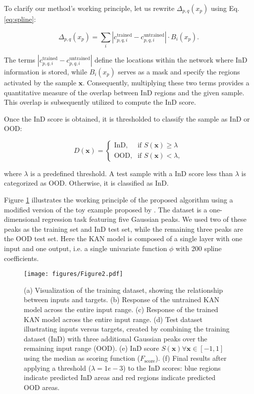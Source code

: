 To clarify our method's working principle, let us rewrite $\Delta_{p,q}(x_p)$ using Eq. \ref{eq:spline}:

\begin{equation}
    \Delta_{p,q}(x_p) = \sum_{i} \left| c_{p,q,i}^{\text{trained}} - c_{p,q,i}^{\text{untrained}}\right| \cdot B_i(x_p).
\end{equation}

The terms $\left| c_{p,q,i}^{\text{trained}} - c_{p,q,i}^{\text{untrained}}\right|$ define the locations within the network where InD information is stored, while $B_i(x_p)$ serves as a mask and specify the regions activated by the sample $\textbf{x}$. 
Consequently, multiplying these two terms provides a quantitative measure of the overlap between InD regions and the given sample. 
This overlap is subsequently utilized to compute the InD score.

Once the InD score is obtained, it is thresholded to classify the sample as InD or OOD:

\begin{equation}
D(\textbf{x}) = 
\begin{cases} 
\text{InD,} & \text{if } S(\textbf{x}) \geq \lambda \\
\text{OOD,} & \text{if } S(\textbf{x}) < \lambda, 
\end{cases}
\end{equation}

where \(\lambda\) is a predefined threshold. 
A test sample with a InD score less than \(\lambda\) is categorized as OOD. 
Otherwise, it is classified as InD. 

Figure \ref{fig:toy_example} illustrates the working principle of the proposed algorithm using a modified version of the toy example proposed by \citet{liu2024kankolmogorovarnoldnetworks}. 
The dataset is a one-dimensional regression task featuring five Gaussian peaks. 
We used two of these peaks as the training set and InD test set, while the remaining three peaks are the OOD test set. 
Here the KAN model is composed of a single layer with one input and one output, i.e. a single univariate function $\phi$ with 200 spline coefficients.

\begin{figure}[ht]
\begin{center}
\texttt{[image: figures/Figure2.pdf]}
\end{center}
\vspace{-5pt}
\caption{(a) Visualization of the training dataset, showing the relationship between inputs and targets. 
(b) Response of the untrained KAN model across the entire input range. 
(c) Response of the trained KAN model across the entire input range. 
(d) Test dataset illustrating inputs versus targets, created by combining the training dataset (InD) with three additional Gaussian peaks over the remaining input range (OOD). 
(e) InD score $S(\textbf{x}) \forall \textbf{x} \in [-1, 1]$ using the median as scoring function ($F_{\text{score}}$). 
(f) Final results after applying a threshold ($\lambda=1e-3$) to the InD scores: blue regions indicate predicted InD areas and red regions indicate predicted OOD areas.}
\label{fig:toy_example}
\end{figure}

